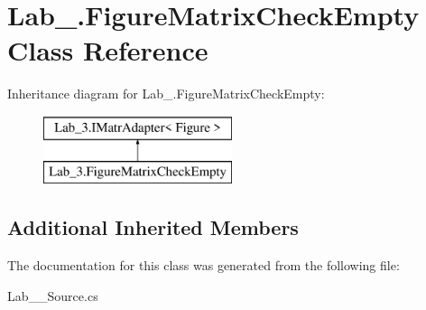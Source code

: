 \hypertarget{class_lab__3_1_1_figure_matrix_check_empty}{}\section{Lab\+\_.\+Figure\+Matrix\+Check\+Empty Class Reference}
\label{class_lab__3_1_1_figure_matrix_check_empty}
Inheritance diagram for Lab\+\_.\+Figure\+Matrix\+Check\+Empty\+:\begin{figure}[H]
\begin{center}
\leavevmode
\includegraphics[height=2.000000cm]{class_lab__3_1_1_figure_matrix_check_empty}
\end{center}
\end{figure}
\subsection*{Additional Inherited Members}


The documentation for this class was generated from the following file\+:\begin{DoxyCompactItemize}
\item 
Lab\+\_\+\_\+\+Source.\+cs\end{DoxyCompactItemize}
